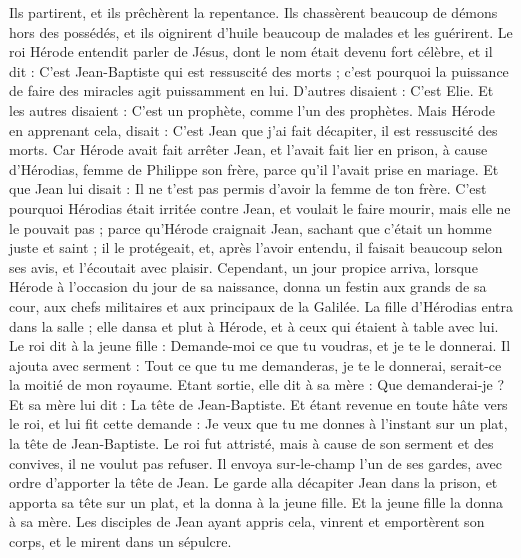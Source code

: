 \begin{multicols}{2}
Ils partirent, et ils prêchèrent la repentance.
Ils chassèrent beaucoup de démons hors des possédés, et ils oignirent d'huile beaucoup de malades et les guérirent.
Le roi Hérode entendit parler de Jésus, dont le nom était devenu fort célèbre, et il dit : C’est Jean-Baptiste qui est ressuscité des morts ; c'est pourquoi la puissance de faire des miracles agit puissamment en lui.
D’autres disaient : C'est Elie. Et les autres disaient : C'est un prophète, comme l’un des prophètes.
Mais Hérode en apprenant cela, disait : C'est Jean que j'ai fait décapiter, il est ressuscité des morts.
Car Hérode avait fait arrêter Jean, et l'avait fait lier en prison, à cause d'Hérodias, femme de Philippe son frère, parce qu'il l'avait prise en mariage.
Et que Jean lui disait : Il ne t'est pas permis d'avoir la femme de ton frère.
C'est pourquoi Hérodias était irritée contre Jean, et voulait le faire mourir, mais elle ne le pouvait pas ;
parce qu’Hérode craignait Jean, sachant que c'était un homme juste et saint ; il le protégeait, et, après l’avoir entendu, il faisait beaucoup selon ses avis, et l’écoutait avec plaisir.
Cependant, un jour propice arriva, lorsque Hérode à l’occasion du jour de sa naissance, donna un festin aux grands de sa cour, aux chefs militaires et aux principaux de la Galilée.
La fille d'Hérodias entra dans la salle ; elle dansa et plut à Hérode, et à ceux qui étaient à table avec lui. Le roi dit à la jeune fille : Demande-moi ce que tu voudras, et je te le donnerai.
Il ajouta avec serment : Tout ce que tu me demanderas, je te le donnerai, serait-ce la moitié de mon royaume.
Etant sortie, elle dit à sa mère : Que demanderai-je ? Et sa mère lui dit : La tête de Jean-Baptiste.
Et étant revenue en toute hâte vers le roi, et lui fit cette demande : Je veux que tu me donnes à l’instant sur un plat, la tête de Jean-Baptiste.
Le roi fut attristé, mais à cause de son serment et des convives, il ne voulut pas refuser.
Il envoya sur-le-champ l’un de ses gardes, avec ordre d'apporter la tête de Jean.
Le garde alla décapiter Jean dans la prison, et apporta sa tête sur un plat, et la donna à la jeune fille. Et la jeune fille la donna à sa mère.
Les disciples de Jean ayant appris cela, vinrent et emportèrent son corps, et le mirent dans un sépulcre.

\end{multicols}
